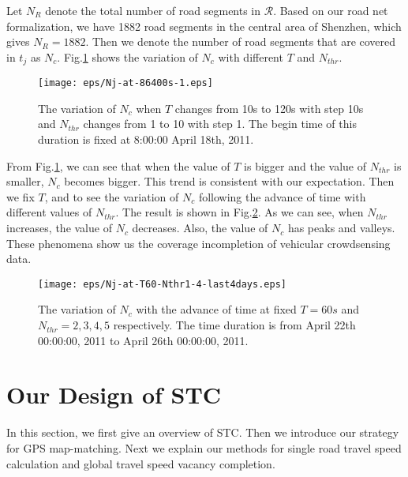 \documentclass[twocolumn,10pt,final,conference]{IEEEtran}
\begin{document}
Let $N_R$ denote the total number of road segments in $\mathcal{R}$. Based on our road net formalization, we have 1882 road segments in the  central area of Shenzhen, which gives $N_R=1882$. Then we denote the number of road segments that are covered  in $t_j$ as $N_c$. Fig.\ref{fig-Nc Variation} shows the variation of $N_c$ with different $T$ and $N_{thr}$.

\begin{figure}[h]
  \centering
\texttt{[image: eps/Nj-at-86400s-1.eps]}
  \caption{The variation of $N_c$ when $T$ changes from 10s to 120s with step 10s and $N_{thr}$ changes from 1 to 10 with step 1. The begin time of this duration is fixed at 8:00:00 April 18th, 2011.}
  \label{fig-Nc Variation}
\end{figure}

From Fig.\ref{fig-Nc Variation}, we can see that when the value of $T$ is bigger and the value of $N_{thr}$ is smaller, $N_c$ becomes bigger. This trend is consistent with our expectation.
Then we fix $T$, and to see the variation of $N_c$ following the advance of time with different values of $N_{thr}$. The result is shown in Fig.\ref{fig-Nj When Fix N_thr and T}. As we can see, when $N_{thr}$ increases, the value of $N_c$ decreases. Also, the value of $N_c$ has peaks and valleys. These phenomena show us the coverage incompletion of vehicular crowdsensing data.
\begin{figure}[h]
  \centering
\texttt{[image: eps/Nj-at-T60-Nthr1-4-last4days.eps]}
  \caption{The variation of $N_c$ with the advance of time at fixed $T=60s$ and $N_{thr}=2,3,4,5$ respectively. The time duration is from April 22th 00:00:00, 2011 to April 26th 00:00:00, 2011.}
  \label{fig-Nj When Fix N_thr and T}
\end{figure}



\section{Our Design of STC}\label{section-STC}
In this section, we first give an overview of STC. Then we introduce our strategy for GPS map-matching. Next we explain our methods for single road travel speed calculation and global travel speed vacancy completion.
\end{document}
